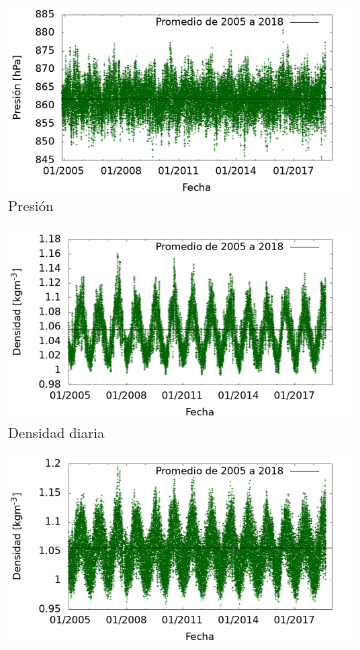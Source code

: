 \begin{figure}[H]
        \begin{subfigure}[b]{0.49\textwidth}
        	\centering
			\includegraphics[width=\textwidth]{Graphs/clima/presion.png}
			\caption{Presión}
			\label{fig:presion}
		\end{subfigure}%
		\hspace{\fill}
        \begin{subfigure}[b]{0.49\textwidth}
			\centering	
			\includegraphics[width=\textwidth]{Graphs/clima/densidad_diaria.png}
			\caption{Densidad diaria}
			\label{fig:densidad_diaria}
        \end{subfigure}%
        \hspace{\fill}
        \begin{subfigure}[b]{0.49\textwidth}
        	\centering
			\includegraphics[width=\textwidth]{Graphs/clima/densidad_media_diaria.png}

\end{subfigure}
\end{figure}

